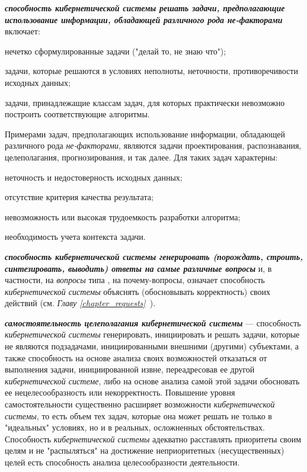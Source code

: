 \textbf{\textit{способность кибернетической системы решать задачи, предполагающие использование информации, обладающей различного рода не-факторами}} включает:
\begin{textitemize}
	\item нечетко сформулированные задачи ("делай то, не знаю что");
	\item задачи, которые решаются в условиях неполноты, неточности, противоречивости исходных данных;
	\item задачи, принадлежащие классам задач, для которых практически невозможно построить соответствующие алгоритмы.
\end{textitemize}
Примерами задач, предполагающих использование информации, обладающей различного рода \textit{не-факторами}, являются задачи проектирования, распознавания, целеполагания, прогнозирования, и так далее.
Для таких задач характерны:
\begin{textitemize}
    \item неточность и недостоверность исходных данных;
    \item отсутствие критерия качества результата;
    \item невозможность или высокая трудоемкость разработки алгоритма;
    \item необходимость учета контекста задачи.
\end{textitemize}

\textbf{\textit{способность кибернетической системы генерировать (порождать, строить, синтезировать, выводить) ответы на самые различные вопросы}} и, в частности, на \textit{вопросы} типа , на почему-вопросы, означает способность \textit{кибернетической системы} объяснять (обосновывать корректность) своих действий (см. \textit{Главу \ref{chapter_requests}~}).

\textbf{\textit{самостоятельность целеполагания кибернетической системы}} --- способность \textit{кибернетической системы} генерировать, инициировать и решать задачи, которые не являются подзадачами, инициированными внешними (другими) субъектами, а также способность на основе анализа своих возможностей отказаться от выполнения задачи, инициированной извне, переадресовав ее другой \textit{кибернетической системе}, либо на основе анализа самой этой задачи обосновать ее нецелесообразность или некорректность.  Повышение уровня самостоятельности существенно расширяет возможности \textit{кибернетической системы}, то есть объем тех задач, которые она может решать не только в "идеальных"{} условиях, но и в реальных, осложненных обстоятельствах. Способность \textit{кибернетической системы} адекватно расставлять приоритеты своим целям и не "распыляться"{} на достижение неприоритетных (несущественных) целей есть способность анализа целесообразности деятельности.

